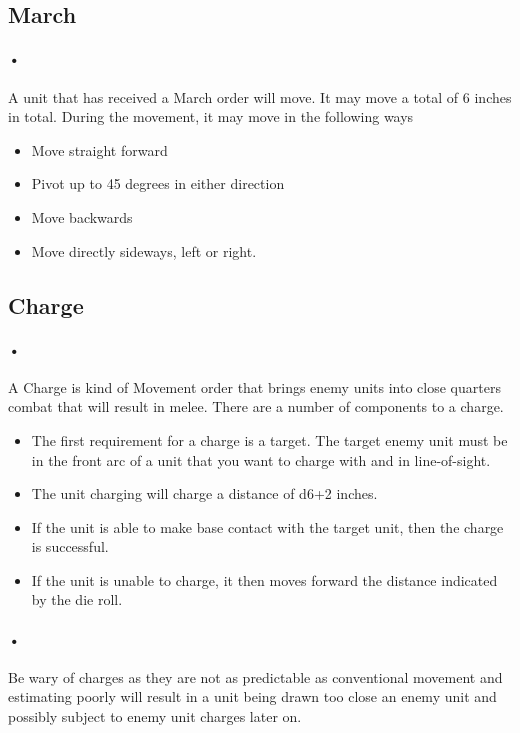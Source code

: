 \documentclass{article}
\begin{document}
\subsection{March}
\paragraph{•}
A unit that has received a March order will move. It may move a total of 6 inches in total. During the movement, it may move in the following ways
\begin{itemize}
\item Move straight forward
\item Pivot up to 45 degrees in either direction
\item Move backwards
\item Move directly sideways, left or right.
\end{itemize}
\subsection{Charge}
\paragraph{•}
A Charge is kind of Movement order that brings enemy units into close quarters combat that will result in melee. There are a number of components to a charge.

\begin{itemize}
\item The first requirement for a charge is a target. The target enemy unit must be in the front arc of a unit that you want to charge with and in line-of-sight.
\item The unit charging will charge a distance of d6+2 inches.
\item If the unit is able to make base contact with the target unit, then the charge is successful.
\item If the unit is unable to charge, it then moves forward the distance indicated by the die roll.
\end{itemize}

\paragraph{•}
Be wary of charges as they are not as predictable as conventional movement and estimating poorly will result in a unit being drawn too close an enemy unit and possibly subject to enemy unit charges later on.
\end{document}

